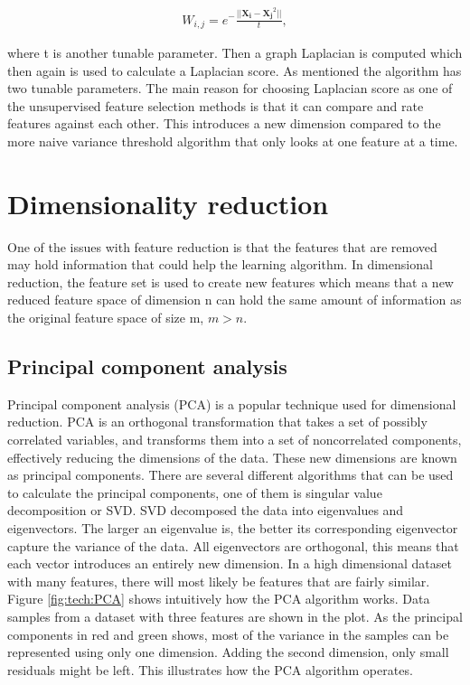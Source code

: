        \begin{align}\label{eq:tech_LS}
            W_{i,j} = e^-{\frac{||{\bm{X_i}-\bm{X_j}}^2||}{t}},
        \end{align}
        
where t is another tunable parameter. Then a graph Laplacian is computed which then again is used to calculate a Laplacian score. As mentioned the algorithm has two tunable parameters. The main reason for choosing Laplacian score as one of the unsupervised feature selection methods is that it can compare and rate features against each other. This introduces a new dimension compared to the more naive variance threshold algorithm that only looks at one feature at a time. 
    

\section{Dimensionality reduction}\label{sec:dim_red}
    One of the issues with feature reduction is that the features that are removed may hold information that could help the learning algorithm. In dimensional reduction, the feature set is used to create new features which means that a new reduced feature space of dimension n can hold the same amount of information as the original feature space of size m, $m>n$.

    \subsection{Principal component analysis}\label{subsec:PCA}
        Principal component analysis (PCA) is a popular technique used for dimensional reduction. PCA is an orthogonal transformation that takes a set of possibly correlated variables, and transforms them into a set of noncorrelated components, effectively reducing the dimensions of the data. These new dimensions are known as principal components. There are several different algorithms that can be used to calculate the principal components, one of them is singular value decomposition or SVD. SVD decomposed the data into eigenvalues and eigenvectors. The larger an eigenvalue is, the better its corresponding eigenvector capture the variance of the data. All eigenvectors are orthogonal, this means that each vector introduces an entirely new dimension. In a high dimensional dataset with many features, there will most likely be features that are fairly similar. Figure \ref{fig:tech:PCA} shows intuitively how the PCA algorithm works. Data samples from a dataset with three features are shown in the plot. As the principal components in red and green shows, most of the variance in the samples can be represented using only one dimension. Adding the second dimension, only small residuals might be left. This illustrates how the PCA algorithm operates. 
        
